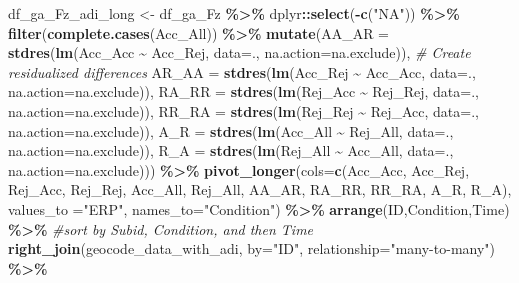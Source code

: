 \documentclass[
]{article}
\newenvironment{Shaded}{\begin{snugshade}}{\end{snugshade}}
\newcommand{\AttributeTok}[1]{\textcolor[rgb]{0.13,0.29,0.53}{#1}}
\newcommand{\CommentTok}[1]{\textcolor[rgb]{0.56,0.35,0.01}{\textit{#1}}}
\newcommand{\FunctionTok}[1]{\textcolor[rgb]{0.13,0.29,0.53}{\textbf{#1}}}
\newcommand{\NormalTok}[1]{#1}
\newcommand{\OtherTok}[1]{\textcolor[rgb]{0.56,0.35,0.01}{#1}}
\newcommand{\SpecialCharTok}[1]{\textcolor[rgb]{0.81,0.36,0.00}{\textbf{#1}}}
\newcommand{\StringTok}[1]{\textcolor[rgb]{0.31,0.60,0.02}{#1}}
\begin{document}
\begin{Shaded}
\begin{Highlighting}[]
\NormalTok{df\_ga\_Fz\_adi\_long }\OtherTok{\textless{}{-}}\NormalTok{ df\_ga\_Fz }\SpecialCharTok{\%\textgreater{}\%}
\NormalTok{  dplyr}\SpecialCharTok{::}\FunctionTok{select}\NormalTok{(}\SpecialCharTok{{-}}\FunctionTok{c}\NormalTok{(}\StringTok{"NA"}\NormalTok{)) }\SpecialCharTok{\%\textgreater{}\%}
  \FunctionTok{filter}\NormalTok{(}\FunctionTok{complete.cases}\NormalTok{(Acc\_All)) }\SpecialCharTok{\%\textgreater{}\%}
  \FunctionTok{mutate}\NormalTok{(}\AttributeTok{AA\_AR =} \FunctionTok{stdres}\NormalTok{(}\FunctionTok{lm}\NormalTok{(Acc\_Acc }\SpecialCharTok{\textasciitilde{}}\NormalTok{ Acc\_Rej, }\AttributeTok{data=}\NormalTok{., }\AttributeTok{na.action=}\NormalTok{na.exclude)), }\CommentTok{\# Create residualized differences}
         \AttributeTok{AR\_AA =} \FunctionTok{stdres}\NormalTok{(}\FunctionTok{lm}\NormalTok{(Acc\_Rej }\SpecialCharTok{\textasciitilde{}}\NormalTok{ Acc\_Acc, }\AttributeTok{data=}\NormalTok{., }\AttributeTok{na.action=}\NormalTok{na.exclude)),}
         \AttributeTok{RA\_RR =} \FunctionTok{stdres}\NormalTok{(}\FunctionTok{lm}\NormalTok{(Rej\_Acc }\SpecialCharTok{\textasciitilde{}}\NormalTok{ Rej\_Rej, }\AttributeTok{data=}\NormalTok{., }\AttributeTok{na.action=}\NormalTok{na.exclude)),}
         \AttributeTok{RR\_RA =} \FunctionTok{stdres}\NormalTok{(}\FunctionTok{lm}\NormalTok{(Rej\_Rej }\SpecialCharTok{\textasciitilde{}}\NormalTok{ Rej\_Acc, }\AttributeTok{data=}\NormalTok{., }\AttributeTok{na.action=}\NormalTok{na.exclude)),}
         \AttributeTok{A\_R =} \FunctionTok{stdres}\NormalTok{(}\FunctionTok{lm}\NormalTok{(Acc\_All }\SpecialCharTok{\textasciitilde{}}\NormalTok{ Rej\_All, }\AttributeTok{data=}\NormalTok{., }\AttributeTok{na.action=}\NormalTok{na.exclude)),}
         \AttributeTok{R\_A =} \FunctionTok{stdres}\NormalTok{(}\FunctionTok{lm}\NormalTok{(Rej\_All }\SpecialCharTok{\textasciitilde{}}\NormalTok{ Acc\_All, }\AttributeTok{data=}\NormalTok{., }\AttributeTok{na.action=}\NormalTok{na.exclude))) }\SpecialCharTok{\%\textgreater{}\%}
  \FunctionTok{pivot\_longer}\NormalTok{(}\AttributeTok{cols=}\FunctionTok{c}\NormalTok{(Acc\_Acc, Acc\_Rej, Rej\_Acc, Rej\_Rej, Acc\_All, Rej\_All, }
\NormalTok{                      AA\_AR, RA\_RR, RR\_RA, A\_R, R\_A), }\AttributeTok{values\_to =}\StringTok{"ERP"}\NormalTok{, }\AttributeTok{names\_to=}\StringTok{"Condition"}\NormalTok{) }\SpecialCharTok{\%\textgreater{}\%}
  \FunctionTok{arrange}\NormalTok{(ID,Condition,Time) }\SpecialCharTok{\%\textgreater{}\%} \CommentTok{\#sort by Subid, Condition, and then Time}
  \FunctionTok{right\_join}\NormalTok{(geocode\_data\_with\_adi, }\AttributeTok{by=}\StringTok{"ID"}\NormalTok{, }\AttributeTok{relationship=}\StringTok{"many{-}to{-}many"}\NormalTok{) }\SpecialCharTok{\%\textgreater{}\%}

\end{Highlighting}
\end{Shaded}
\end{document}
